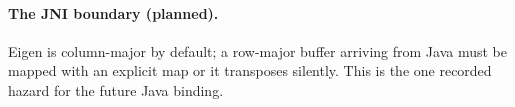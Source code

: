 \paragraph{The JNI boundary (planned).} Eigen is column-major by default; a
row-major buffer arriving from Java must be mapped with an explicit
 map or it transposes silently. This is the one recorded
hazard for the future Java binding.
